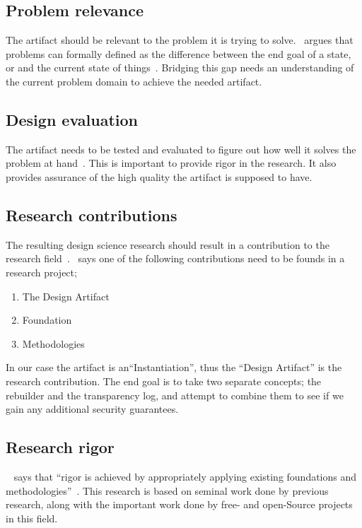\documentclass[../Main/thesis.tex]{subfiles}
\begin{document}
\subsection*{Problem relevance}%
\label{sub:problem_relevance}
The artifact should be relevant to the problem it is trying to
solve.~\citeauthor{Hevner:2004:DSI:2017212.2017217} argues that problems can
formally defined as the difference between the end goal of a state, or and the
current state of things~\cite{Hevner:2004:DSI:2017212.2017217}. Bridging this
gap needs an understanding of the current problem domain to achieve the needed
artifact.

\subsection*{Design evaluation}%
\label{sub:design_evaluation}
The artifact needs to be tested and evaluated to figure out how well it solves
the problem at hand~\cite{Hevner:2004:DSI:2017212.2017217}. This is important to
provide rigor in the research. It also provides assurance of the high quality
the artifact is supposed to have.

\subsection*{Research contributions}%
\label{sub:research_contributions}
The resulting design science research should result in a contribution to the
research
field~\cite{Hevner:2004:DSI:2017212.2017217}.~\citeauthor{Hevner:2004:DSI:2017212.2017217}
says one of the following contributions need to be founds in a research
project;

\begin{enumerate}
    \item The Design Artifact
    \item Foundation
    \item Methodologies
\end{enumerate}

In our case the artifact is an``Instantiation'', thus the ``Design Artifact'' is
the research contribution. The end goal is to take two separate concepts; the
rebuilder and the transparency log, and attempt to combine them to see if we
gain any additional security guarantees.

\subsection*{Research rigor}%
\label{sub:research_rigor}
~\citeauthor{Hevner:2004:DSI:2017212.2017217} says that ``rigor is achieved by
appropriately applying existing foundations and
methodologies''~\cite{Hevner:2004:DSI:2017212.2017217}. This research is based
on seminal work done by previous research, along with the important work done by
free- and open-Source projects in this field. 
\end{document}
